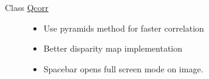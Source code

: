 \label{todo__todo000001}
\hypertarget{todo__todo000001}{}
 \begin{description}
\item[Class \hyperlink{classQcorr}{Qcorr} ]\begin{itemize}
\item Use pyramids method for faster correlation\item Better disparity map implementation\item Spacebar opens full screen mode on image.\end{itemize}


\end{description}
